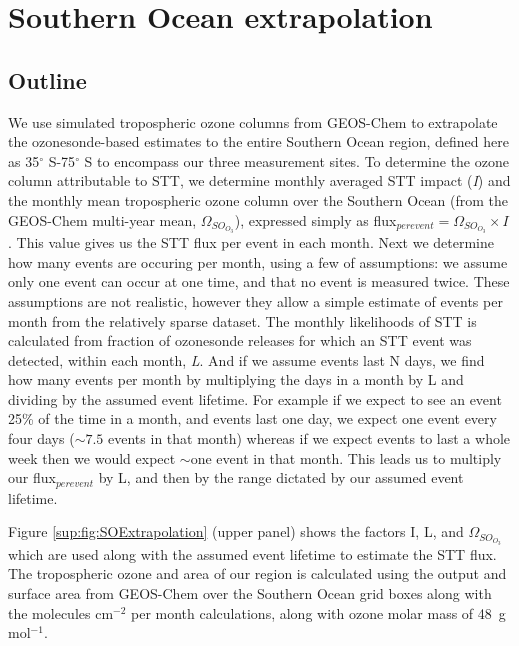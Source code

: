\section{Southern Ocean extrapolation}
  \label{sup:sec:SOExtrapolation}

  \subsection{Outline}
    We use simulated tropospheric ozone columns from GEOS-Chem to extrapolate the ozonesonde-based estimates to the entire Southern Ocean region, defined here as 35$^{\circ}$ S-75$^{\circ}$ S to encompass our three measurement sites. 
    To determine the ozone column attributable to STT, we determine monthly averaged STT impact (\textit{I}) and the monthly mean tropospheric ozone column over the Southern Ocean (from the GEOS-Chem multi-year mean, $\Omega_{SO_{O_3}}$), expressed simply as flux$_{per event} = \Omega_{SO_{O_3}} \times I$.
    This value gives us the STT flux per event in each month.
    Next we determine how many events are occuring per month, using a few of assumptions: we assume only one event can occur at one time, and that no event is measured twice.
    These assumptions are not realistic, however they allow a simple estimate of events per month from the relatively sparse dataset.
    The monthly likelihoods of STT is calculated from fraction of ozonesonde releases for which an STT event was detected, within each month, \textit{L}.
    And if we assume events last N days, we find how many events per month by multiplying the days in a month by L and dividing by the assumed event lifetime.
    For example if we expect to see an event 25\% of the time in a month, and events last one day, we expect one event every four days ($\sim 7.5$ events in that month) whereas if we expect events to last a whole week then we would expect $\sim$one event in that month.
    This leads us to multiply our flux$_{per event}$ by L, and then by the range dictated by our assumed event lifetime.
    
    Figure \ref{sup:fig:SOExtrapolation} (upper panel) shows the factors I, L, and $\Omega_{SO_{O_3}}$ which are used along with the assumed event lifetime to estimate the STT flux.
    The tropospheric ozone and area of our region is calculated using the output and surface area from GEOS-Chem over the Southern Ocean grid boxes along with the molecules cm$^{-2}$ per month calculations, along with ozone molar mass of 48~g mol$^{-1}$.
    
